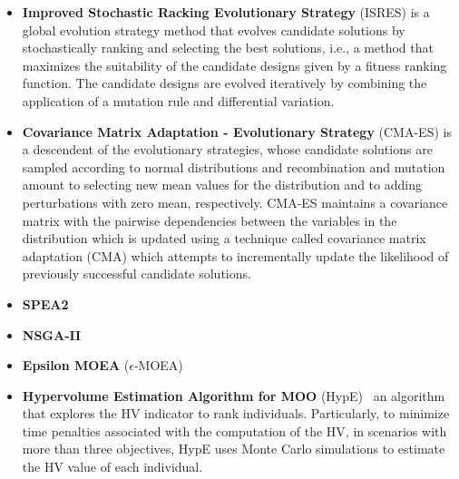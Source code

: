 \begin{itemize}
	\item \textbf{Improved Stochastic Racking Evolutionary Strategy} (ISRES) \cite{Runarsson2000} is a global evolution strategy method that evolves candidate solutions by stochastically ranking and selecting the best solutions, i.e., a method that maximizes the suitability of the candidate designs given by a fitness ranking function. The candidate designs are evolved iteratively by combining the application of a mutation rule and differential variation.
			
	\item \textbf{Covariance Matrix Adaptation - Evolutionary Strategy} (CMA-ES) \cite{Hansen2006} is a descendent of the evolutionary strategies, whose candidate solutions are sampled according to normal distributions and recombination and mutation amount to selecting new mean values for the distribution and to adding perturbations with zero mean, respectively. CMA-ES maintains a covariance matrix with the pairwise dependencies between the variables in the distribution which is updated using a technique called covariance matrix adaptation (CMA) which attempts to incrementally update the likelihood of previously successful candidate solutions.
	
	\item \textbf{SPEA2}
	
	\item \textbf{NSGA-II}
	
	\item \textbf{Epsilon \ac{MOEA}} ($\epsilon$-MOEA) 
	
	\item \textbf{Hypervolume Estimation Algorithm for \ac{MOO}} (HypE)~\cite{Zitzler2011HypE} an algorithm that explores the \ac{HV} indicator to rank individuals. Particularly, to minimize time penalties associated with the computation of the \ac{HV}, in scenarios with more than three objectives, HypE uses Monte Carlo simulations to estimate the \ac{HV} value of each individual.
	

\end{itemize}

